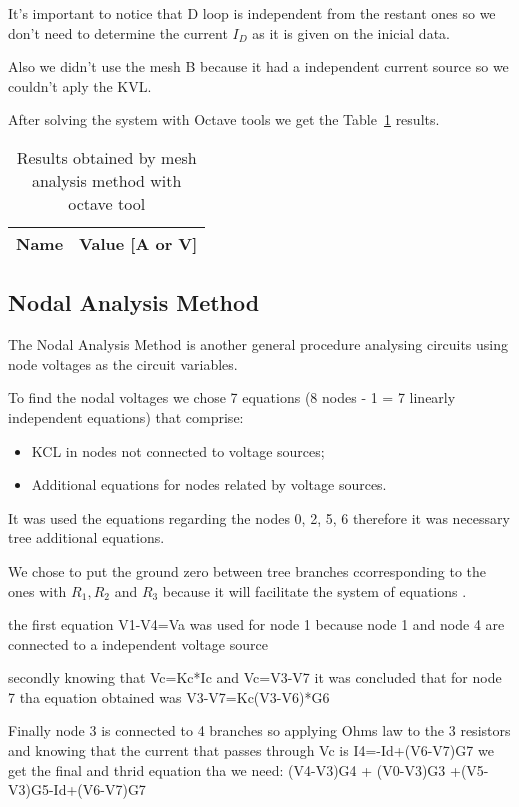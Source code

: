 It's important to notice that D loop is independent from the restant ones so we don't need to determine the current $I_D$ as it is given on the inicial data.

Also we didn't use the mesh B because it had a independent current source so we couldn't aply the KVL.

After solving the system with Octave tools we get the Table~\ref{tab:mesh} results.

\begin{table}[h]
  \centering
  \begin{tabular}{|l|r|}
    \hline    
    {\bf Name} & {\bf Value [A or V]} \\ \hline
    
  \end{tabular}
  \caption{ Results obtained by mesh analysis method with octave tool}
  \label{tab:mesh}
\end{table}


\subsection{Nodal Analysis Method}

\hspace{0,5cm} The Nodal Analysis Method is another general procedure analysing circuits using node voltages as the circuit variables. 

To find the nodal voltages we chose 7 equations (8 nodes - 1 = 7 linearly independent equations) that comprise:
\begin{itemize}
\item  KCL in nodes not connected to voltage sources;
\item Additional equations for nodes related by voltage sources.
\end{itemize}

It was used the equations regarding the nodes 0, 2, 5, 6 therefore it was necessary tree additional equations.

We chose to put the ground zero between tree branches ccorresponding to the ones with $R_1, R_2$ and $R_3$ because it will facilitate the system of equations .

the first equation V1-V4=Va was used for node 1 because node 1 and node 4 are connected to a independent voltage source

secondly knowing that Vc=Kc*Ic and Vc=V3-V7  it was concluded that for node 7 tha equation obtained was V3-V7=Kc(V3-V6)*G6

Finally node 3 is connected to 4 branches so applying  Ohms law to the 3 resistors and knowing that the current that passes through Vc is I4=-Id+(V6-V7)G7 we get the final and thrid equation tha we need: (V4-V3)G4 + (V0-V3)G3 +(V5-V3)G5-Id+(V6-V7)G7

